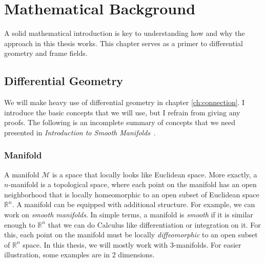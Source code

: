 \documentclass[../thesis.tex]{subfiles}
\begin{document}
\chapter{Mathematical Background}\label{ch:math-background}

A solid mathematical introduction is key to understanding how and why the approach
in this thesis works. This chapter serves as a primer to differential geometry and frame fields.
\section{Differential Geometry}
We will make heavy use of differential geometry in chapter \ref{ch:connection}.
I introduce the basic concepts that we will use, but I refrain from
giving any proofs. The following is an incomplete summary of concepts that we need presented in
\emph{Introduction to Smooth Manifolds}~\cite{LeeManifold}.

\subsection{Manifold} A manifold $\mathcal{M}$ is a space that locally looks like Euclidean space.
More exactly, a $n$-manifold is a topological space, where each point on the manifold has an open neighborhood
that is locally homeomorphic to an open subset of Euclidean space $\mathbb{R}^n$.
A manifold can be equipped with additional structure. For example, we can work on \emph{smooth manifolds}.
In simple terms, a manifold is \emph{smooth} if it is similar enough to $\mathbb{R}^n$ that we can do Calculus
like differentiation or integration on it. For this, each point on the manifold must be
locally \emph{diffeomorphic} to an open subset of $\mathbb{R}^n$ space.
In this thesis, we will mostly work with 3-manifolds. For easier illustration, some examples are in 2 dimensions.
\end{document}
